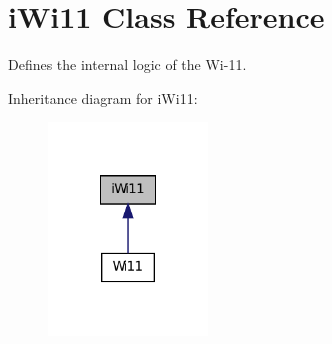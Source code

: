 \hypertarget{classiWi11}{
\section{iWi11 Class Reference}
\label{classiWi11}
}


Defines the internal logic of the Wi-\/11.  




Inheritance diagram for iWi11:\nopagebreak
\begin{figure}[H]
\begin{center}
\leavevmode
\includegraphics[width=120pt]{classiWi11__inherit__graph}
\end{center}
\end{figure}

